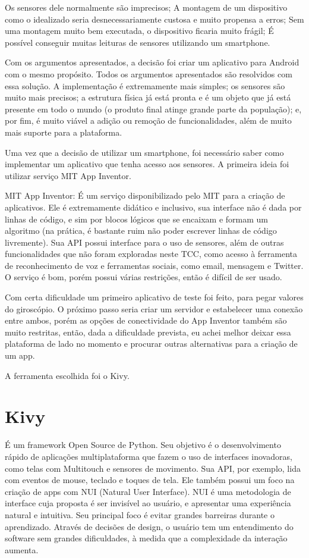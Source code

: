 \documentclass[a4paper,12pt]{article}
\begin{document}
Os sensores dele normalmente são imprecisos;
A montagem de um dispositivo como o idealizado seria desnecessariamente custosa e muito propensa a erros;
Sem uma montagem muito bem executada, o dispositivo ficaria muito frágil;
É possível conseguir muitas leituras de sensores utilizando um smartphone.


  Com os argumentos apresentados, a decisão foi criar um aplicativo para Android com o mesmo propósito. Todos os argumentos apresentados são resolvidos com essa solução. A implementação é extremamente mais simples; os sensores são muito mais precisos; a estrutura física já está pronta e é um objeto que já está presente em todo o mundo (o produto final atinge grande parte da população); e, por fim, é muito viável a adição ou remoção de funcionalidades, além de muito mais suporte para a plataforma.


  Uma vez que a decisão de utilizar um smartphone, foi necessário saber como implementar um aplicativo que tenha acesso aos sensores.
  A primeira ideia foi utilizar serviço MIT App Inventor.


MIT App Inventor:
  É um serviço disponibilizado pelo MIT para a criação de aplicativos. Ele é extremamente didático e inclusivo, sua interface não é dada por linhas de código, e sim por blocos lógicos que se encaixam e formam um algoritmo (na prática, é bastante ruim não poder escrever linhas de código livremente). Sua API possui interface para o uso de sensores, além de outras funcionalidades que não foram exploradas neste TCC, como acesso à ferramenta de reconhecimento de voz e ferramentas sociais, como email, mensagem e Twitter. O serviço é bom, porém possui várias restrições, então é difícil de ser usado.


Com certa dificuldade um primeiro aplicativo de teste foi feito, para pegar valores do giroscópio. O próximo passo seria criar um servidor e estabelecer uma conexão entre ambos, porém as opções de conectividade do App Inventor também são muito restritas, então, dada a dificuldade prevista, eu achei melhor deixar essa plataforma de lado no momento e procurar outras alternativas para a criação de um app.


A ferramenta escolhida foi o Kivy.

\section{Kivy}

É um framework Open Source de Python. Seu objetivo é o desenvolvimento rápido de aplicações multiplataforma que fazem o uso de interfaces inovadoras, como telas com Multitouch e sensores de movimento. Sua API, por exemplo, lida com eventos de mouse, teclado e toques de tela. Ele também possui um foco na criação de apps com NUI (Natural User Interface).
  NUI é uma metodologia de interface cuja proposta é ser invisível ao usuário, e apresentar uma experiência natural e intuitiva. Seu principal foco é evitar grandes barreiras durante o aprendizado. Através de decisões de design, o usuário tem um entendimento do software sem grandes dificuldades, à medida que a complexidade da interação aumenta.
\end{document}
